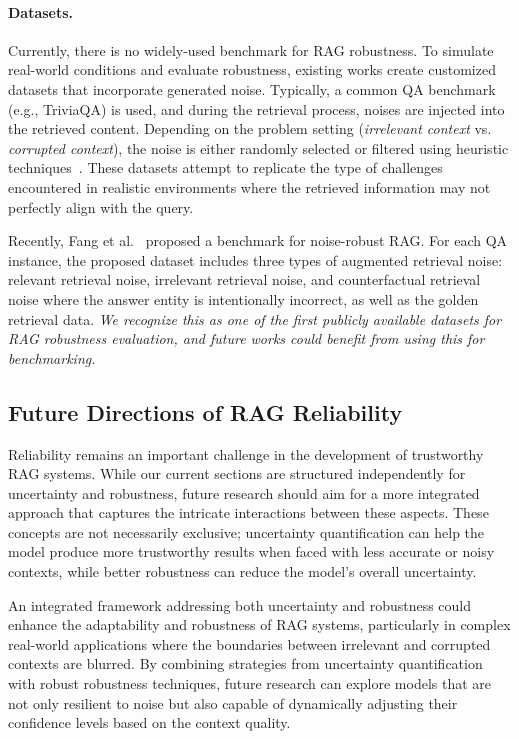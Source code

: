\paragraph{Datasets.} Currently, there is no widely-used benchmark for RAG robustness. To simulate real-world conditions and evaluate robustness, existing works create customized datasets that incorporate generated noise. Typically, a common QA benchmark (e.g., TriviaQA) %
is used, and during the retrieval process, noises are injected into the retrieved content. Depending on the problem setting (\textit{irrelevant context} vs. \textit{corrupted context}), the noise is either randomly selected or filtered using heuristic techniques~\cite{dual_rag_2024, robust_rag_iclr_2024}. These datasets attempt to replicate the type of challenges encountered in realistic environments where the retrieved information may not perfectly align with the query.

Recently, %
Fang et al.~\cite{adaptive_adversarial_rag_2024} proposed a benchmark for noise-robust RAG. For each QA instance, the proposed dataset includes three types of augmented retrieval noise: relevant retrieval noise, irrelevant retrieval noise, and counterfactual retrieval noise where the answer entity is intentionally incorrect, as well as the golden retrieval data. \textit{We recognize this as one of the first publicly available datasets for RAG robustness evaluation, and future works could benefit from using this for benchmarking.} %

\subsection{Future Directions of RAG Reliability}
Reliability remains an important challenge in the development of trustworthy RAG systems. While our current sections are structured independently for uncertainty and robustness, future research should aim for a more integrated approach that captures the intricate interactions between these aspects. These concepts are not necessarily exclusive; uncertainty quantification can help the model produce more trustworthy results when faced with less accurate or noisy contexts, while better robustness can reduce the model's overall uncertainty.

An integrated framework addressing both uncertainty and robustness could enhance the adaptability and robustness of RAG systems, particularly in complex real-world applications where the boundaries between irrelevant and corrupted contexts are blurred. By combining strategies from uncertainty quantification with robust robustness techniques, future research can explore models that are not only resilient to noise but also capable of dynamically adjusting their confidence levels based on the context quality.

